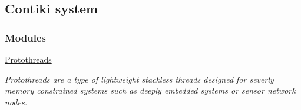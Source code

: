 \hypertarget{a00057}{\subsection{\-Contiki system}
\label{a00057}
}
\subsubsection*{\-Modules}
\begin{DoxyCompactItemize}
\item 
\hyperlink{a00052}{\-Protothreads}
\begin{DoxyCompactList}\small\item\em \-Protothreads are a type of lightweight stackless threads designed for severly memory constrained systems such as deeply embedded systems or sensor network nodes. \end{DoxyCompactList}\end{DoxyCompactItemize}
